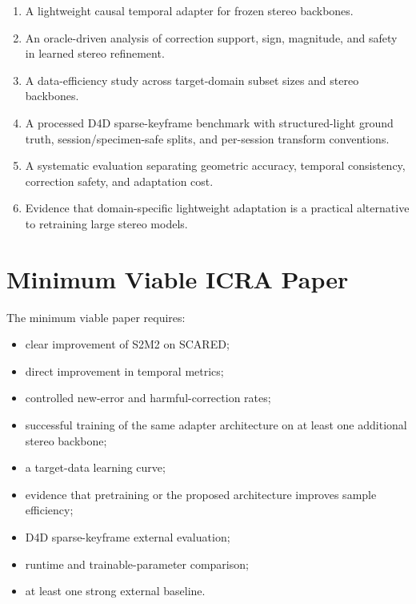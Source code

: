\documentclass[11pt,a4paper]{article}
\newcommand{\smodel}{S2M2}
\begin{document}
\begin{enumerate}[leftmargin=*]
    \item A lightweight causal temporal adapter for frozen stereo backbones.

    \item An oracle-driven analysis of correction support, sign, magnitude, and
    safety in learned stereo refinement.

    \item A data-efficiency study across target-domain subset sizes and stereo
    backbones.

    \item A processed D4D sparse-keyframe benchmark with structured-light ground
    truth, session/specimen-safe splits, and per-session transform conventions.

    \item A systematic evaluation separating geometric accuracy, temporal
    consistency, correction safety, and adaptation cost.

    \item Evidence that domain-specific lightweight adaptation is a practical
    alternative to retraining large stereo models.
\end{enumerate}

\section{Minimum Viable ICRA Paper}

The minimum viable paper requires:

\begin{itemize}[leftmargin=*]
    \item clear improvement of \smodel{} on SCARED;
    \item direct improvement in temporal metrics;
    \item controlled new-error and harmful-correction rates;
    \item successful training of the same adapter architecture on at least one
    additional stereo backbone;
    \item a target-data learning curve;
    \item evidence that pretraining or the proposed architecture improves
    sample efficiency;
    \item D4D sparse-keyframe external evaluation;
    \item runtime and trainable-parameter comparison;
    \item at least one strong external baseline.
\end{itemize}
\end{document}
